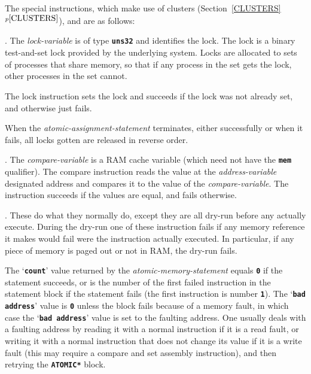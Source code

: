 \documentclass[12pt]{article}
\newcommand{\TT}[1]{{\tt \bfseries #1}}
\newcommand{\itemref}[1]{\ref{#1}$^{p\pageref{#1}}$}
\newenvironment{indpar}[1][0.3in]%
	{\begin{list}{}%
		     {\setlength{\itemsep}{0in}%
		      \setlength{\topsep}{0in}%
		      \setlength{\parsep}{1ex}%
		      \setlength{\labelwidth}{#1}%
		      \setlength{\leftmargin}{#1}%
		      \addtolength{\leftmargin}{\labelsep}}%
	 \item}%
	{\end{list}}
\begin{document}
The special instructions,
which make use of clusters (Section~\itemref{CLUSTERS}),
and are as follows:
\begin{indpar}[0.4in]
\hspace*{-0.2in}{\em \bf Lock-Instruction}.
The {\em lock-variable} is of type \TT{uns32}
and identifies the lock.
The lock is a binary test-and-set lock provided by the
underlying system.  Locks are allocated to sets of processes
that share memory, so that if any process in the set gets
the lock, other processes in the set cannot.

The lock instruction sets the lock and succeeds if the lock
was not already set, and otherwise just fails.

When the {\em atomic-assignment-statement} terminates, either
successfully or when it fails, all locks gotten are released in
reverse order.

\hspace*{-0.2in}{\em \bf Compare-Instruction}.
The {\em compare-variable} is a RAM cache variable (which need
not have the \TT{mem} qualifier).  The compare
instruction reads the value at the {\em address-variable} designated
address and compares
it to the value of the {\em compare-variable}.  The instruction
succeeds if the values are equal, and fails otherwise.


\hspace*{-0.2in}{\em \bf Write-Instructions}.
These do what they normally do, except they are all dry-run 
before any actually execute.  During the dry-run one of these
instruction fails if any memory reference it makes would fail
were the instruction actually executed.  In particular, if any
piece of memory is paged out or not in RAM, the dry-run fails.
\end{indpar}

The `\TT{count}' value returned by the {\em atomic-memory-statement}
equals \TT{0} if the statement succeeds, or is the number of the
first failed instruction in the statement block if the statement
fails (the first instruction is number \TT{1}).
The `\TT{bad address}' value is \TT{0} unless the block
fails because of a memory fault, in which case the `\TT{bad address}'
value is set to the faulting address.  One usually deals with a faulting
address by reading it with a normal instruction if it is a read fault,
or writing it with a normal instruction that does not change its
value if it is a write fault (this may require a compare and set
assembly instruction),
and then retrying the \TT{*ATOMIC*} block.
\end{document}

